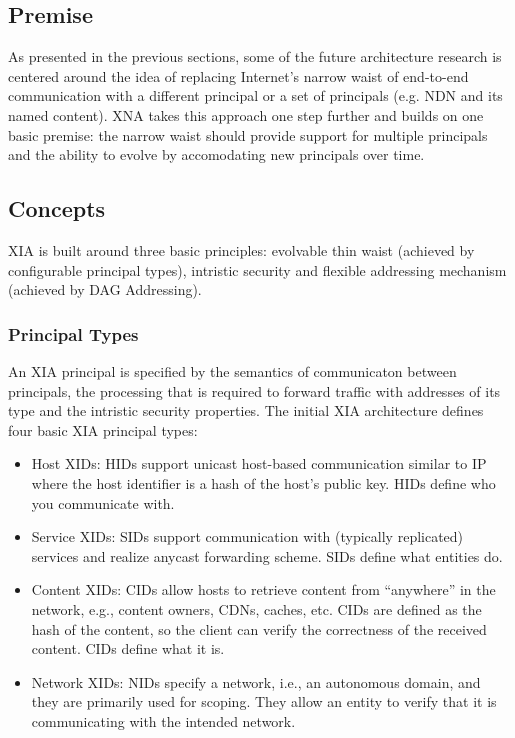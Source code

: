         \subsection{Premise}

            As presented in the previous sections, some of the future architecture research is centered around the idea of replacing Internet's narrow waist of end-to-end communication with a different principal or a set of principals (e.g. NDN and its named content). XNA takes this approach one step further and builds on one basic premise: the narrow waist should provide support for multiple principals and the ability to evolve by accomodating new principals over time.

        \subsection{Concepts}

            XIA is built around three basic principles: evolvable thin waist (achieved by configurable principal types), intristic security and flexible addressing mechanism (achieved by DAG Addressing).

            \subsubsection{Principal Types}

                An XIA principal is specified by the semantics of communicaton between principals, the processing that is required to forward traffic with addresses of its type and the intristic security properties. The initial XIA architecture defines four basic XIA principal types:

                \begin{itemize}
                    \item Host XIDs: HIDs support unicast host-based communication similar to IP where the host identifier is a hash of the host’s public key. HIDs define who you communicate with.
                    \item Service XIDs: SIDs support communication with (typically replicated) services and realize anycast forwarding scheme. SIDs define what entities do.
                    \item Content XIDs: CIDs allow hosts to retrieve content from ``anywhere'' in the network, e.g., content owners, CDNs, caches, etc. CIDs are defined as the hash of the content, so the client can verify the correctness of the received content. CIDs define what it is.
                    \item Network XIDs: NIDs specify a network, i.e., an autonomous domain, and they are primarily used for scoping. They allow an entity to verify that it is communicating with the intended network.
                \end{itemize}


